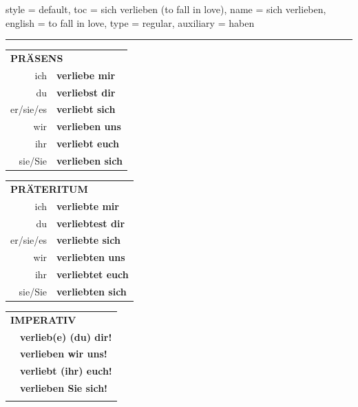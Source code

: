 \begin{verbentry}{
  style = {default},
  toc = {sich verlieben (to fall in love)},
  name = {sich verlieben},
  english = {to fall in love},
  type = {regular},
  auxiliary = {haben}
}
 
    
       \vspace{5pt}

    \hrule
    
    \vspace{5pt}

  \begin{tabular}{rl}
     \multicolumn{2}{l}{\textbf{PRÄSENS} }\\
    ich & \textbf{verliebe mir}\\
    du & \textbf{verliebst dir}\\
    er/sie/es & \textbf{verliebt sich}\\
    wir & \textbf{verlieben uns}\\
    ihr & \textbf{verliebt euch}\\
    sie/Sie & \textbf{verlieben sich}\\
  \end{tabular}
  \hfill
     \begin{tabular}{rl}
    \multicolumn{2}{l}{\textbf{PRÄTERITUM} }\\
    ich & \textbf{verliebte mir}\\
    du & \textbf{verliebtest dir}\\
    er/sie/es & \textbf{verliebte sich}\\
    wir & \textbf{verliebten uns}\\
    ihr & \textbf{verliebtet euch}\\
    sie/Sie & \textbf{verliebten sich}\\
  \end{tabular}
  \hfill
  \begin{tabular}{rl}
     \multicolumn{2}{l}{\textbf{IMPERATIV} }\\
   & \textbf{verlieb(e) (du) dir!}\\
   & \textbf{verlieben wir uns!}\\
   & \textbf{verliebt (ihr) euch!}\\
   & \textbf{verlieben Sie sich!}\\
   & \vspace{10pt}
  \end{tabular}

    \vspace{10pt}


\end{verbentry}
